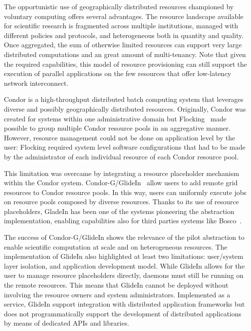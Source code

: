 \documentclass{sig-alternate}
\begin{document}
The opportunistic use of geographically distributed resources championed by
voluntary computing offers several advantages. The resource landscape available
for scientific research is fragmented across multiple institutions, managed
with different policies and protocols, and heterogeneous both in quantity and
quality. Once aggregated, the sum of otherwise limited resources can support
very large distributed computations and an great amount of multi-tenancy. Note
that given the required capabilities, this model of resource provisioning can
still support the execution of parallel applications on the few resources that
offer low-latency network interconnect.

Condor is a high-throughput distributed batch computing system that leverages
diverse and possibly geographically distributed resources. Originally, Condor
was created for systems within one administrative domain but
Flocking~\cite{Epema:1996:flocking} made possible to group multiple Condor
resource pools in an aggregative manner. However, resource management could not
be done on application level by the user: Flocking required system level
software configurations that had to be made by the administrator of each
individual resource of each Condor resource pool.

This limitation was overcame by integrating a resource placeholder mechanism
within the Condor system. Condor-G/GlideIn~\cite{condor-g} allow users to add
remote grid resources to Condor resource pools. In this way, users can
uniformly execute jobs on resource pools composed by diverse resources. Thanks
to its use of resource placeholders, GladeIn has been one of the systems
pioneering the \pilot abstraction implementation, enabling \pilot capabilities
also for third parties systems like Bosco~\cite{bosco}.

The success of Condor-G/GlideIn shows the relevance of the pilot abstraction to
enable scientific computation at scale and on heterogeneous resources. The
implementation of GlideIn also highlighted at least two limitations:
user/system layer isolation, and application development model. While GlideIn
allows for the user to manage resource placeholders directly, daemons must
still be running on the remote resources. This means that GlideIn cannot be
deployed without involving the resource owners and system administrators.
Implemented as a service, GlideIn support integration with distributed
application frameworks but does not programmatically support the development of
distributed applications by means of dedicated APIs and libraries.
\end{document}
